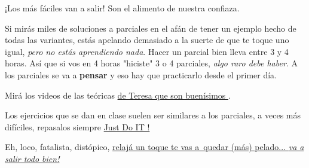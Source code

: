 {\begin{minipage}{0.7\textwidth}
    ¡Los más fáciles van a salir! Son el alimento de nuestra confiaza.\par\medskip

    Si mirás miles de soluciones a parciales en el afán de tener un ejemplo hecho de todas las
    variantes, estás apelando demasiado a la suerte de que te toque uno igual, \textit{pero no estás aprendiendo nada}.
    Hacer un parcial bien lleva entre 3 y 4 horas. Así que si vos en 4 horas "hiciste" 3 o 4 parciales, \textit{algo raro debe haber}.
    A los parciales se va a \textbf{pensar} y eso hay que practicarlo desde el primer día.\par\medskip

          Mirá los videos de las teóricas \href{\videosTeresa}{de Teresa que son buenísimos }.\par\medskip

    Los ejercicios que se dan en clase suelen ser similares a los parciales,
    a veces más difíciles, repasalos siempre \href{\justDoIt}{Just Do IT !}
  \end{minipage}
}
\vspace*{\fill}

Eh, loco, fatalista, distópico, \href{\dontWorryAboutAThing}{relajá un toque te vas a\
  quedar (más) pelado...  \textit{va a salir todo bien!}}
